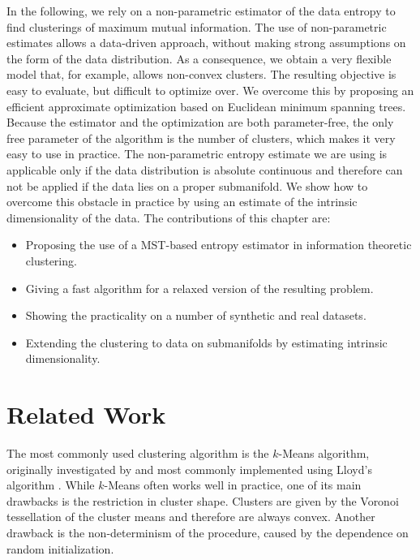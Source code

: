 In the following, we rely on a non-parametric estimator of the data entropy to find 
clusterings of maximum mutual information.
%
The use of non-parametric estimates allows a data-driven approach, without 
making strong assumptions on the form of the data distribution.
%
As a consequence, we obtain a very flexible model that, for example, allows 
non-convex clusters.
%
The resulting objective is easy to evaluate, but difficult to optimize
over. We overcome this by proposing an efficient approximate optimization
based on Euclidean minimum spanning trees.
%
Because the estimator and the optimization are both parameter-free, 
the only free parameter of the algorithm is the number of clusters, 
which makes it very easy to use in practice.
%
The non-parametric entropy estimate we
are using is applicable only if the data distribution is absolute continuous and
therefore can not be applied if the data lies on a proper submanifold.
We show how to overcome this obstacle in practice by using an estimate of the
intrinsic dimensionality of the data.
%
The contributions of this chapter are:
\begin{itemize}
    \item Proposing the use of a MST-based entropy estimator in information theoretic clustering.
    \item Giving a fast algorithm for a relaxed version of the resulting problem.
    \item Showing the practicality on a number of synthetic and real datasets.
    \item Extending the clustering to data on submanifolds by estimating intrinsic dimensionality.
\end{itemize}

%


\section{Related Work}
The most commonly used clustering algorithm is the $k$-Means algorithm, originally
investigated by \citet{macqueen1967some} and most commonly implemented using
Lloyd's algorithm \citep{macqueen1967some,lloyd1982least}. While
$k$-Means often works well in practice, one of its main drawbacks is the
restriction in cluster shape. 
%
Clusters are given by the Voronoi tessellation of the cluster means and
therefore are always convex.  Another drawback is the non-determinism of the
procedure, caused by the dependence on random initialization.

